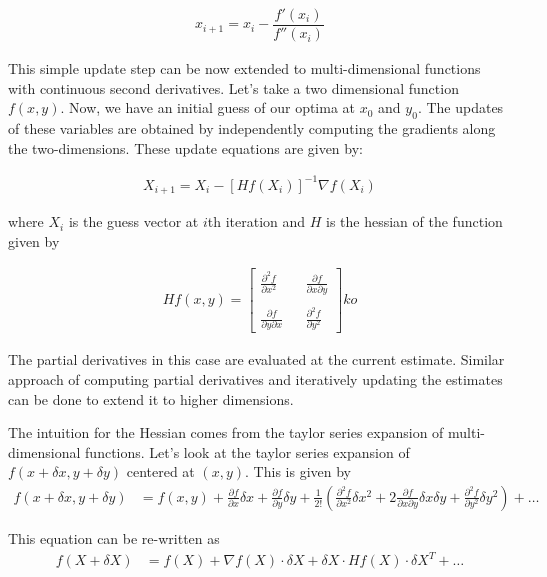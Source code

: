 \documentclass[book.tex]{subfiles}
\begin{document}
\begin{align}
x_{i+1} = x_i - \dfrac{f'(x_i)}{f''(x_i)}
\end{align}
	
This simple update step can be now extended to multi-dimensional functions with continuous second derivatives. Let's take a two dimensional function $f(x,y)$. Now, we have an initial guess of our optima at $x_0$ and $y_0$. The updates of these variables are obtained by independently computing the gradients along the two-dimensions. These update equations are given by:
	
\begin{align}
X_{i+1}  = X_{i} - [Hf(X_i)]^{-1} \nabla f(X_i)
\end{align}

where $X_{i}$ is the guess vector at $i$th iteration and $H$ is the hessian of the function given by 

\begin{align}
Hf(x,y) = 
\begin{bmatrix}
\frac{\partial^2 f}{ \partial x^2} && \frac{\partial f}{\partial x \partial y}\\ \\
\frac{\partial f}{\partial y \partial x} && \frac{\partial^2 f}{\partial y^2}
\end{bmatrix}
ko\end{align}

The partial derivatives in this case are evaluated at the current estimate. Similar approach of computing partial derivatives and iteratively updating the estimates can be done to extend it to higher dimensions.

The intuition for the Hessian comes from the taylor series expansion of multi-dimensional functions. Let's look at the taylor series expansion of $f(x+\delta x,y + \delta y)$ centered at $(x,y)$. This is given by
\begin{align}
f(x+\delta x,y + \delta y) &= f(x,y) + \frac{\partial f}{\partial x}\delta x + \frac{\partial f}{\partial y}\delta y + \frac{1}{2!}(\frac{\partial^2 f}{\partial x^2} \delta x^2 + 2\frac{\partial f}{\partial x \partial y}\delta x\delta y  + \frac{\partial^2 f}{\partial y^2} \delta y^2) + \dots
\end{align}

This equation can be re-written as
\begin{align}
f(X + \delta X) &= f(X) + \nabla f(X)\cdot \delta X + \delta X\cdot H f(X)\cdot\delta X^T  + \dots
\end{align}
  
\end{document}
